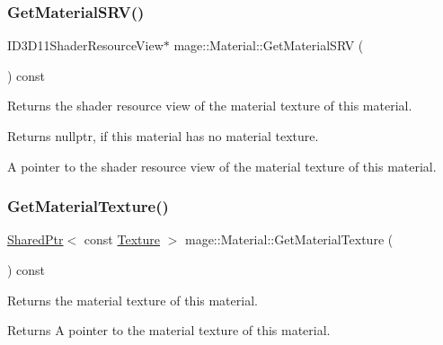 \subsubsection{\texorpdfstring{Get\+Material\+S\+R\+V()}{GetMaterialSRV()}}
{\footnotesize\ttfamily I\+D3\+D11\+Shader\+Resource\+View$\ast$ mage\+::\+Material\+::\+Get\+Material\+S\+RV (\begin{DoxyParamCaption}{ }\end{DoxyParamCaption}) const\hspace{0.3cm}{\ttfamily [noexcept]}}

Returns the shader resource view of the material texture of this material.

\begin{DoxyReturn}{Returns}
{\ttfamily nullptr}, if this material has no material texture. 

A pointer to the shader resource view of the material texture of this material. 
\end{DoxyReturn}
\hypertarget{classmage_1_1_material_aa8accf832423420f6b2ed4b50ef394b3}{}\label{classmage_1_1_material_aa8accf832423420f6b2ed4b50ef394b3} 
\subsubsection{\texorpdfstring{Get\+Material\+Texture()}{GetMaterialTexture()}}
{\footnotesize\ttfamily \hyperlink{namespacemage_a1e01ae66713838a7a67d30e44c67703e}{Shared\+Ptr}$<$ const \hyperlink{classmage_1_1_texture}{Texture} $>$ mage\+::\+Material\+::\+Get\+Material\+Texture (\begin{DoxyParamCaption}{ }\end{DoxyParamCaption}) const\hspace{0.3cm}{\ttfamily [noexcept]}}

Returns the material texture of this material.

\begin{DoxyReturn}{Returns}
A pointer to the material texture of this material. 
\end{DoxyReturn}
\hypertarget{classmage_1_1_material_a9d91ff9ce999d24558305f070d0cde93}{}\label{classmage_1_1_material_a9d91ff9ce999d24558305f070d0cde93} 
